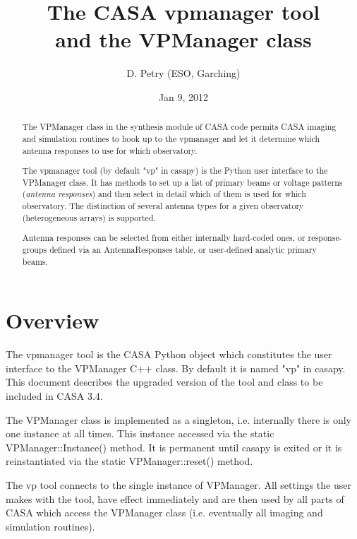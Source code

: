 \documentclass[12pt]{article}
\begin{document}
\title{The CASA vpmanager tool\\ and the VPManager class}
\author{D. Petry (ESO, Garching)}
\date{Jan 9, 2012\\%
}
\maketitle
\normalsize
{}

\begin{abstract}
\noindent
The VPManager class in the synthesis module of CASA code permits 
CASA imaging and simulation routines to hook up to the vpmanager and let it determine
which antenna responses to use for which observatory.

The vpmanager tool (by default "vp" in casapy) is the Python user interface to the VPManager
class. It has methods to set up a list of primary beams or voltage patterns
({\it antenna responses}) and then select in detail 
which of them is used for which observatory.
The distinction of several antenna types for a given observatory (heterogeneous
arrays) is supported.
 
Antenna responses can be selected from either internally 
hard-coded ones, or response-groups defined via an AntennaResponses table, or
user-defined analytic primary beams.
\end{abstract}

\section{Overview}

The vpmanager tool is the CASA Python object which constitutes the
user interface to the VPManager C++ class. By default it is named "vp" in casapy.
This document describes
the upgraded version of the tool and class to be included in CASA 3.4.

The VPManager class is implemented as a singleton, i.e. internally there is only one instance
at all times. This instance accessed via the static VPManager::Instance() method. It is permanent 
until casapy is exited or it is reinstantiated via the static VPManager::reset() method.

The vp tool connects to the single instance of VPManager.
All settings the user makes with the tool, have effect immediately and are then used
by all parts of CASA which access the VPManager class (i.e. eventually all imaging and simulation
routines).
\end{document}
